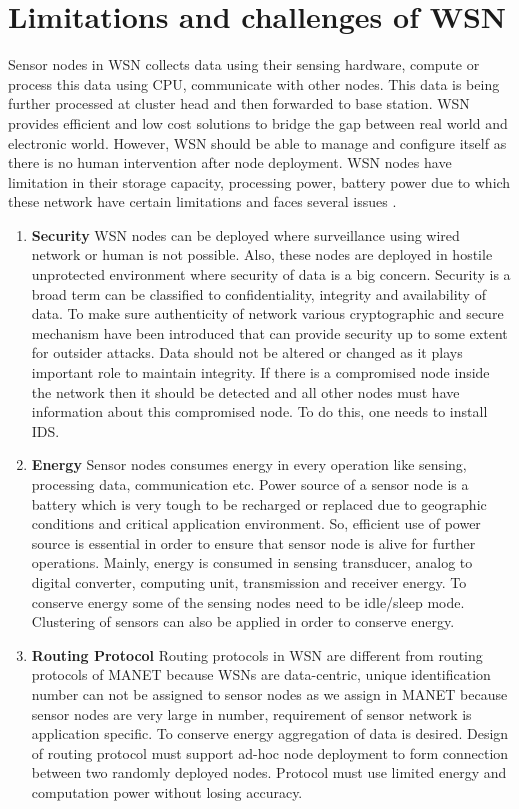 \section{Limitations and challenges of WSN} \label{WSNChallenges}
Sensor nodes in WSN collects data using their sensing hardware, compute or process this data using CPU, communicate with other nodes. This data is being further processed at cluster head and then forwarded to base station. WSN provides efficient and low cost solutions to bridge the gap between real world and electronic world. However, WSN should be able to manage and configure itself as there is no human intervention after node deployment. WSN nodes have limitation in their storage capacity, processing power, battery power due to which these network have certain limitations and faces several issues \cite{sharma2013issues}.
\begin{enumerate}[label=\textbf{\roman*}]
    \item \textbf{Security }
    WSN nodes can be deployed where surveillance using wired network or human is not possible. Also, these nodes are deployed in hostile unprotected environment where security of data is a big concern. Security is a broad term can be classified to confidentiality, integrity and availability of data. To make sure authenticity of network various cryptographic and secure mechanism have been introduced that can provide security up to some extent for outsider attacks. Data should not be altered or changed as it plays important role to maintain integrity. If there is a compromised node inside the network then it should be detected and all other nodes must have information about this compromised node. To do this, one needs to install IDS.
    \item \textbf{Energy }
    Sensor nodes consumes energy in every operation like sensing, processing data, communication etc. Power source of a sensor node is a battery which is very tough to be recharged or replaced due to geographic conditions and critical application environment. So, efficient use of power source is essential in order to ensure that sensor node is alive for further operations. Mainly, energy is consumed in sensing transducer, analog to digital converter, computing unit, transmission and receiver energy. To conserve energy some of the sensing nodes need to be idle/sleep mode. Clustering of sensors can also be applied in order to conserve energy.
    \item \textbf{Routing Protocol }
    Routing protocols in WSN are different from routing protocols of MANET because WSNs are data-centric, unique identification number can not be assigned to sensor nodes as we assign in MANET because sensor nodes are very large in number, requirement of sensor network is application specific. To conserve energy aggregation of data is desired. Design of routing protocol must support ad-hoc node deployment to form connection between two randomly deployed nodes. Protocol must use limited energy and computation power without losing accuracy.

\end{enumerate}
